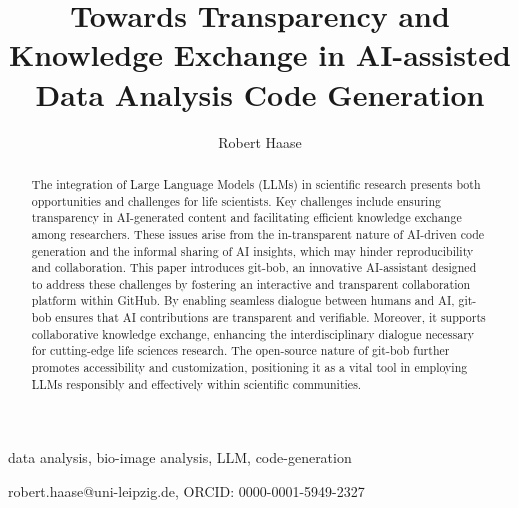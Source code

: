 \documentclass[times, twoside]{zHenriquesLab-StyleBioRxiv}
\begin{document}
\title{Towards Transparency and Knowledge Exchange in AI-assisted Data Analysis Code Generation}

\author[1,2,\Letter]{Robert Haase}


\maketitle

\begin{abstract}

The integration of Large Language Models (LLMs) in scientific research presents both opportunities and challenges for life scientists. Key challenges include ensuring transparency in AI-generated content and facilitating efficient knowledge exchange among researchers. These issues arise from the in-transparent nature of AI-driven code generation and the informal sharing of AI insights, which may hinder reproducibility and collaboration. This paper introduces git-bob, an innovative AI-assistant designed to address these challenges by fostering an interactive and transparent collaboration platform within GitHub. By enabling seamless dialogue between humans and AI, git-bob ensures that AI contributions are transparent and verifiable. Moreover, it supports collaborative knowledge exchange, enhancing the interdisciplinary dialogue necessary for cutting-edge life sciences research. The open-source nature of git-bob further promotes accessibility and customization, positioning it as a vital tool in employing LLMs responsibly and effectively within scientific communities.

\end {abstract}

\begin{keywords}
data analysis, bio-image analysis, LLM, code-generation
\end{keywords}

\begin{corrauthor}
robert.haase@uni-leipzig.de, ORCID: 0000-0001-5949-2327
\end{corrauthor}
\end{document}
